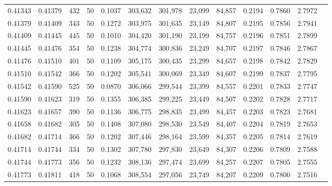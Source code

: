 \begin{tabular}{rrrrrrrrrrrrr}
0.41343 & 0.41379 &   432 &  50 &                                     0.1037 & 303,632 & 301,978 &  23,099 &  84,857 & 0.2194 & 0.7860 & 2.7972 \\
0.41379 & 0.41409 &   343 &  50 &                                     0.1272 & 303,975 & 301,635 &  23,149 &  84,807 & 0.2195 & 0.7856 & 2.7941 \\
0.41409 & 0.41445 &   445 &  50 &                                     0.1010 & 304,420 & 301,190 &  23,199 &  84,757 & 0.2196 & 0.7851 & 2.7899 \\
0.41445 & 0.41476 &   354 &  50 &                                     0.1238 & 304,774 & 300,836 &  23,249 &  84,707 & 0.2197 & 0.7846 & 2.7867 \\
0.41476 & 0.41510 &   401 &  50 &                                     0.1109 & 305,175 & 300,435 &  23,299 &  84,657 & 0.2198 & 0.7842 & 2.7829 \\
0.41510 & 0.41542 &   366 &  50 &                                     0.1202 & 305,541 & 300,069 &  23,349 &  84,607 & 0.2199 & 0.7837 & 2.7795 \\
0.41542 & 0.41590 &   525 &  50 &                                     0.0870 & 306,066 & 299,544 &  23,399 &  84,557 & 0.2201 & 0.7833 & 2.7747 \\
0.41590 & 0.41623 &   319 &  50 &                                     0.1355 & 306,385 & 299,225 &  23,449 &  84,507 & 0.2202 & 0.7828 & 2.7717 \\
0.41623 & 0.41657 &   390 &  50 &                                     0.1136 & 306,775 & 298,835 &  23,499 &  84,457 & 0.2203 & 0.7823 & 2.7681 \\
0.41658 & 0.41682 &   305 &  50 &                                     0.1408 & 307,080 & 298,530 &  23,549 &  84,407 & 0.2204 & 0.7819 & 2.7653 \\
0.41682 & 0.41714 &   366 &  50 &                                     0.1202 & 307,446 & 298,164 &  23,599 &  84,357 & 0.2205 & 0.7814 & 2.7619 \\
0.41714 & 0.41744 &   334 &  50 &                                     0.1302 & 307,780 & 297,830 &  23,649 &  84,307 & 0.2206 & 0.7809 & 2.7588 \\
0.41744 & 0.41773 &   356 &  50 &                                     0.1232 & 308,136 & 297,474 &  23,699 &  84,257 & 0.2207 & 0.7805 & 2.7555 \\
0.41773 & 0.41811 &   418 &  50 &                                     0.1068 & 308,554 & 297,056 &  23,749 &  84,207 & 0.2209 & 0.7800 & 2.7516 \\

\end{tabular}
